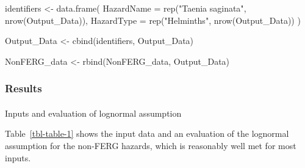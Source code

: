 \documentclass[
  letterpaper,
  DIV=11,
  numbers=noendperiod]{scrartcl}
\makeatletter
\let\oldparagraph\paragraph
\renewcommand{\paragraph}{
    \@ifstar
      \xxxParagraphStar
      \xxxParagraphNoStar
  }
\newcommand{\xxxParagraphStar}[1]{\oldparagraph*{#1}\mbox{}}
\newcommand{\xxxParagraphNoStar}[1]{\oldparagraph{#1}\mbox{}}
\newenvironment{Shaded}{\begin{snugshade}}{\end{snugshade}}
\newcommand{\AttributeTok}[1]{\textcolor[rgb]{0.40,0.45,0.13}{#1}}
\newcommand{\FunctionTok}[1]{\textcolor[rgb]{0.28,0.35,0.67}{#1}}
\newcommand{\NormalTok}[1]{\textcolor[rgb]{0.00,0.23,0.31}{#1}}
\newcommand{\OtherTok}[1]{\textcolor[rgb]{0.00,0.23,0.31}{#1}}
\newcommand{\StringTok}[1]{\textcolor[rgb]{0.13,0.47,0.30}{#1}}
\makeatother
\begin{document}
\begin{Shaded}
\begin{Highlighting}[]
\NormalTok{identifiers }\OtherTok{\textless{}{-}} \FunctionTok{data.frame}\NormalTok{(}
 \AttributeTok{HazardName =} \FunctionTok{rep}\NormalTok{(}\StringTok{"Taenia saginata"}\NormalTok{,  }\FunctionTok{nrow}\NormalTok{(Output\_Data)), }
 \AttributeTok{HazardType =} \FunctionTok{rep}\NormalTok{(}\StringTok{"Helminths"}\NormalTok{,  }\FunctionTok{nrow}\NormalTok{(Output\_Data))}
\NormalTok{ )}
         

\NormalTok{Output\_Data }\OtherTok{\textless{}{-}} \FunctionTok{cbind}\NormalTok{(identifiers,  Output\_Data)}

\NormalTok{NonFERG\_data }\OtherTok{\textless{}{-}} \FunctionTok{rbind}\NormalTok{(NonFERG\_data,  Output\_Data)}
\end{Highlighting}
\end{Shaded}

\subsubsection{Results}\label{results}

\paragraph{Inputs and evaluation of lognormal
assumption}\label{inputs-and-evaluation-of-lognormal-assumption}

Table~\ref{tbl-table-1} shows the input data and an evaluation of the
lognormal assumption for the non-FERG hazards, which is reasonably well
met for most inputs.
\end{document}
